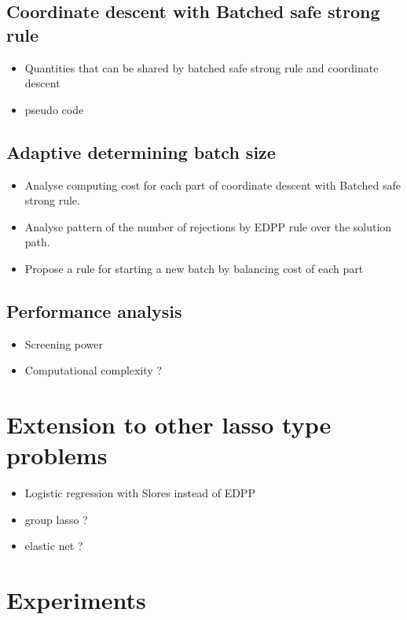 \documentclass{article}
\begin{document}
\subsection{Coordinate descent with Batched safe strong rule}

\begin{itemize}
    \item Quantities that can be shared by batched safe strong rule and coordinate descent
    \item pseudo code
\end{itemize}

\subsection{Adaptive determining batch size}
\label{sec:batch-size}
\begin{itemize}
    \item Analyse computing cost for each part of coordinate descent with Batched safe strong rule.
    \item Analyse pattern of the number of rejections by EDPP rule over the solution path.
    \item Propose a rule for starting a new batch by balancing cost of each part
\end{itemize}

\subsection{Performance analysis}
\begin{itemize}
    \item Screening power
    \item Computational complexity ?
\end{itemize}

\section{Extension to other lasso type problems}
\label{sec:4}

\begin{itemize}
    \item Logistic regression with Slores instead of EDPP
    \item group lasso ?
    \item elastic net ?
\end{itemize}

\section{Experiments}
\label{sec:5}
\end{document}

